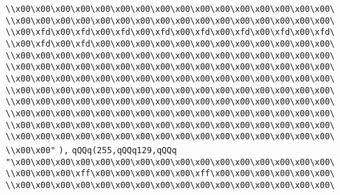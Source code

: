 \verb|\\x00\x00\x00\x00\x00\x00\x00\x00\x00\x00\x00\x00\x00\x00\x00\x00\|\newline
\verb|\\x00\x00\x00\x00\x00\x00\x00\x00\x00\x00\x00\x00\x00\x00\x00\x00\|\newline
\verb|\\x00\xfd\x00\xfd\x00\xfd\x00\xfd\x00\xfd\x00\xfd\x00\xfd\x00\xfd\|\newline
\verb|\\x00\xfd\x00\xfd\x00\x00\x00\x00\x00\x00\x00\x00\x00\x00\x00\x00\|\newline
\verb|\\x00\x00\x00\x00\x00\x00\x00\x00\x00\x00\x00\x00\x00\x00\x00\x00\|\newline
\verb|\\x00\x00\x00\x00\x00\x00\x00\x00\x00\x00\x00\x00\x00\x00\x00\x00\|\newline
\verb|\\x00\x00\x00\x00\x00\x00\x00\x00\x00\x00\x00\x00\x00\x00\x00\x00\|\newline
\verb|\\x00\x00\x00\x00\x00\x00\x00\x00\x00\x00\x00\x00\x00\x00\x00\x00\|\newline
\verb|\\x00\x00\x00\x00\x00\x00\x00\x00\x00\x00\x00\x00\x00\x00\x00\x00\|\newline
\verb|\\x00\x00\x00\x00\x00\x00\x00\x00\x00\x00\x00\x00\x00\x00\x00\x00\|\newline
\verb|\\x00\x00\x00\x00\x00\x00\x00\x00\x00\x00\x00\x00\x00\x00\x00\x00\|\newline
\verb|\\x00\x00\x00\x00\x00\x00\x00\x00\x00\x00\x00\x00\x00\x00\x00\x00\|\newline
\verb|\\x00\x00"|\newline
\verb|),|\newline
\verb|qQQq(255,qQQq129,qQQq|\newline
\verb|"\x00\x00\x00\x00\x00\x00\x00\x00\x00\x00\x00\x00\x00\x00\x00\x00\|\newline
\verb|\\x00\x00\x00\xff\x00\x00\x00\x00\x00\xff\x00\x00\x00\x00\x00\x00\|\newline
\verb|\\x00\x00\x00\x00\x00\x00\x00\x00\x00\x00\x00\x00\x00\x00\x00\x00\|\newline
